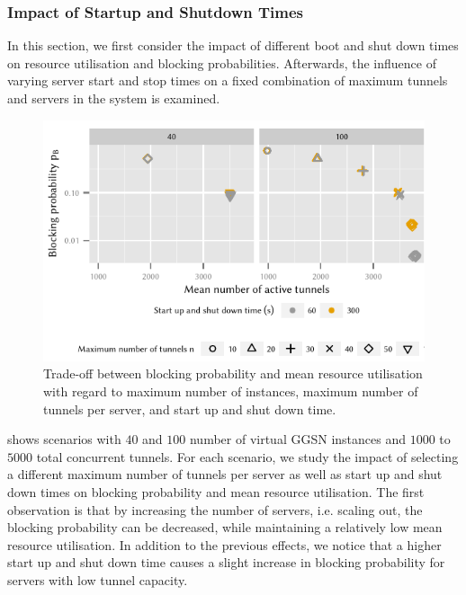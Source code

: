 \subsubsection*{Impact of Startup and Shutdown Times}\label{sec:cloud_virtualized_network_functions:startup_shutdown}

In this section, we first consider the impact of different boot and shut down times on resource utilisation and blocking probabilities.
Afterwards, the influence of varying server start and stop times on a fixed combination of maximum tunnels and servers in the system is examined.

\begin{figure}
  \centering
  \includegraphics{cloud/virtualized_network_functions/performance_evaluation/figures/compare_util_block}
  \caption{Trade-off between blocking probability and mean resource utilisation with regard to maximum number of instances, maximum number of tunnels per server, and start up and shut down time.}
  \label{fig:cloud_virtualized_network_functions:startup_shutdown:compare_util_block}
\end{figure}

 shows scenarios with \(40\) and \(100\) number of virtual \gls{GGSN} instances and  \(1000\) to \(5000\) total concurrent tunnels.
For each scenario, we study the impact of selecting a different maximum number of tunnels per server as well as start up and shut down times on blocking probability and mean resource utilisation.
The first observation is that by increasing the number of servers, i.e. scaling out, the blocking probability can be decreased, while maintaining a relatively low mean resource utilisation.
In addition to the previous effects, we notice that a higher start up and shut down time causes a slight increase in blocking probability for servers with low tunnel capacity.

